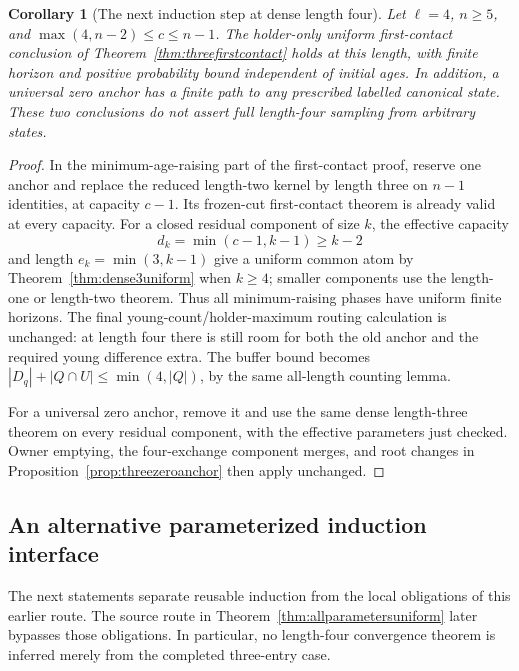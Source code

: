 \documentclass[11pt]{article}
\newtheorem{corollary}[theorem]{Corollary}
\begin{document}
\begin{corollary}[The next induction step at dense length four]
\label{cor:densefourstructure}
Let $\ell=4$, $n\ge5$, and $\max(4,n-2)\le c\le n-1$.
The holder-only uniform first-contact conclusion of
Theorem~\ref{thm:threefirstcontact} holds at this length,
with finite horizon and positive probability bound independent
of initial ages. In addition, a universal zero anchor has
a finite path to any prescribed labelled canonical state.
These two conclusions do not assert full length-four sampling
from arbitrary states.
\end{corollary}
\begin{proof}
In the minimum-age-raising part of the first-contact proof,
reserve one anchor and replace the reduced length-two kernel
by length three on $n-1$ identities, at capacity $c-1$.
Its frozen-cut first-contact theorem is already valid at
every capacity. For a closed residual component of size $k$,
the effective capacity
\[
 d_k=\min(c-1,k-1)\ge k-2
\]
and length $e_k=\min(3,k-1)$ give a uniform common atom by
Theorem~\ref{thm:dense3uniform} when $k\ge4$; smaller components
use the length-one or length-two theorem.
Thus all minimum-raising phases have uniform finite horizons.
The final young-count/holder-maximum routing calculation is
unchanged: at length four there is still room for both the
old anchor and the required young difference extra.
The buffer bound becomes
$|D_q|+|Q\cap U|\le\min(4,|Q|)$, by the same all-length
counting lemma.

For a universal zero anchor, remove it and use the same dense
length-three theorem on every residual component, with the
effective parameters just checked. Owner emptying, the
four-exchange component merges, and root changes in
Proposition~\ref{prop:threezeroanchor} then apply unchanged.
\end{proof}

\subsection{An alternative parameterized induction interface}

The next statements separate reusable induction from the local
obligations of this earlier route. The source route in
Theorem~\ref{thm:allparametersuniform} later bypasses those obligations.
In particular, no length-four convergence theorem is
inferred merely from the completed three-entry case.
\end{document}
